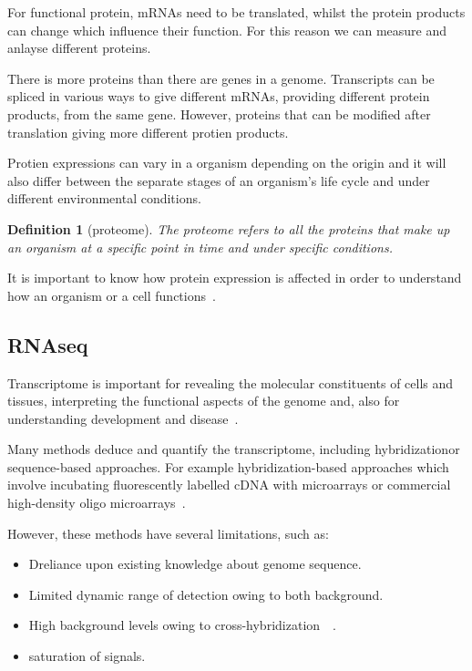 \documentclass{report}
\newtheorem{definition}{Definition}[section]
\begin{document}
For functional protein, mRNAs need to be translated, whilst the protein products can change which influence their function. For this reason we can measure and anlayse different proteins. 

There is more proteins than there are genes in a genome. Transcripts can be spliced in various ways to give different mRNAs, providing different protein products, from the same gene. However, proteins that can be modified after translation giving more different protien products.

Protien expressions can vary in a organism depending on the origin and it will also differ between the separate stages of an organism’s life cycle and under different environmental conditions. 

\begin{definition}[proteome]
    The proteome refers to all the proteins that make up an organism at a specific point in time and under specific conditions.
\end{definition}

It is important to know how protein expression is affected in order to understand how an organism or a cell functions~\cite{zvelebil_understanding_2008}.

\subsection{RNAseq}

Transcriptome is important for revealing the molecular constituents of cells and tissues, interpreting the functional aspects of the genome and, also for understanding development and disease~\cite{wang_rna-seq_2009}.

Many methods deduce and quantify the transcriptome, including hybridizationor sequence-based approaches. For example hybridization-based approaches which involve incubating fluorescently labelled cDNA with microarrays or commercial high-density oligo microarrays~\cite{wang_rna-seq_2009}.

However, these methods have several limitations, such as: 
\begin{itemize}
    \item Dreliance upon existing knowledge about genome sequence.
    \item Limited dynamic range of detection owing to both background.
    \item High background levels owing to cross-hybridization~\cite{okoniewski_hybridization_2006}~\cite{royce_toward_2007}.
    \item saturation of signals.
\end{itemize}
\end{document}
